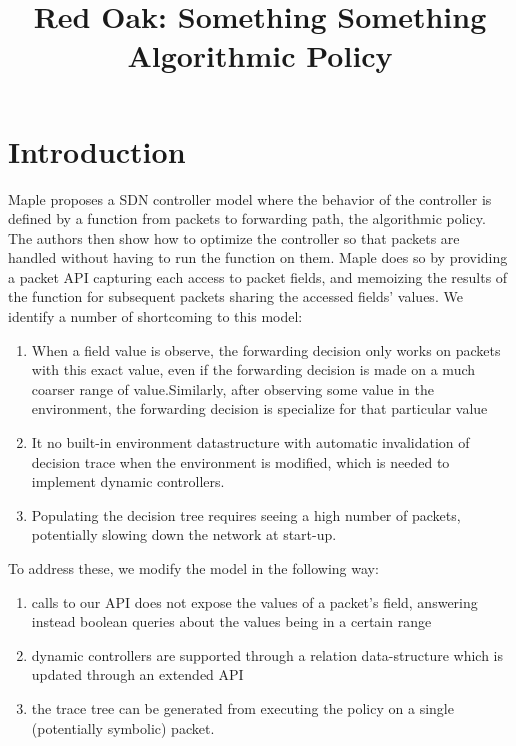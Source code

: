 \documentclass[preprint]{sigplanconf}
\title{Red Oak: Something Something Algorithmic Policy}
\begin{document}
\maketitle

\section*{Introduction}

Maple \cite{Maple} proposes a SDN controller model where the behavior of the controller is defined by a function from packets to forwarding path, the algorithmic policy. The authors then show how to optimize the controller so that packets are handled without having to run the function on them. Maple does so by providing a packet API capturing each access to packet fields, and memoizing the results of the function for subsequent packets sharing the accessed fields' values. We identify a number of shortcoming to this model:
\begin{enumerate}
\item When a field value is observe, the forwarding decision only works on packets with this exact value, even if the forwarding decision is made on a much coarser range of value.Similarly, after observing some value in the environment, the forwarding decision is specialize for that particular value
  
\item It no built-in environment datastructure with automatic invalidation of decision trace when the environment is modified, which is needed to implement dynamic controllers.
  
  \item Populating the decision tree requires seeing a high number of packets, potentially slowing down the network at start-up. 
\end{enumerate}


To address these, we modify the model in the following way:
\begin{enumerate}
  \item calls to our API does not expose the values of a packet's field, answering instead boolean queries about the values being in a certain range
  \item dynamic controllers are supported through a relation data-structure which is updated through an extended API
  \item the trace tree can be generated from executing the policy on a single (potentially symbolic) packet.
\end{enumerate}
\end{document}
